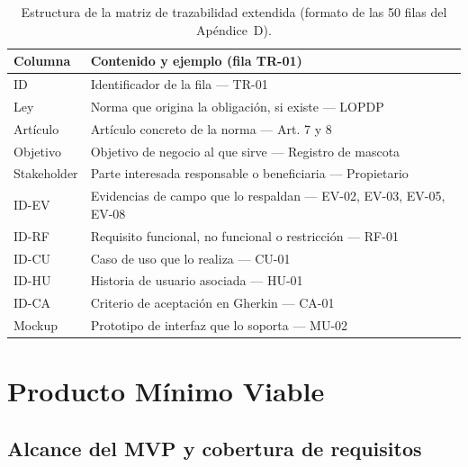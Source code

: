 \documentclass[journal,onecolumn]{IEEEtran}
\begin{document}
	\begin{table}[H]
		\centering
		\caption{Estructura de la matriz de trazabilidad extendida (formato de las 50 filas del Apéndice~D).}
		\label{tab:trazabilidad}
		\small
		\begin{tabularx}{\textwidth}{@{}l X@{}}
			\toprule
			\textbf{Columna} & \textbf{Contenido y ejemplo (fila TR-01)} \\
			\midrule
			ID & Identificador de la fila --- TR-01 \\
			Ley & Norma que origina la obligación, si existe --- LOPDP \\
			Artículo & Artículo concreto de la norma --- Art. 7 y 8 \\
			Objetivo & Objetivo de negocio al que sirve --- Registro de mascota \\
			Stakeholder & Parte interesada responsable o beneficiaria --- Propietario \\
			ID-EV & Evidencias de campo que lo respaldan --- EV-02, EV-03, EV-05, EV-08 \\
			ID-RF & Requisito funcional, no funcional o restricción --- RF-01 \\
			ID-CU & Caso de uso que lo realiza --- CU-01 \\
			ID-HU & Historia de usuario asociada --- HU-01 \\
			ID-CA & Criterio de aceptación en Gherkin --- CA-01 \\
			Mockup & Prototipo de interfaz que lo soporta --- MU-02 \\
			\bottomrule
		\end{tabularx}
	\end{table}
	
	\section{Producto Mínimo Viable}
	\label{sec:mvp}
	
	\subsection{Alcance del MVP y cobertura de requisitos}
	\label{sec:mvp-alcance}
	
\end{document}
